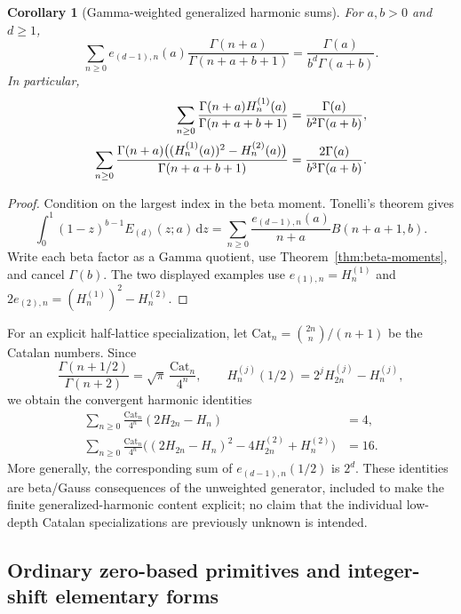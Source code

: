 \documentclass[11pt,oneside]{article}
\numberwithin{equation}{section}
\newtheorem{corollary}[theorem]{Corollary}
\theoremstyle{definition}
\theoremstyle{remark}
\newcommand{\dd}{\,\mathrm d}
\begin{document}
\begin{corollary}[Gamma-weighted generalized harmonic sums]
\label{cor:gamma-harmonic}
For $a,b>0$ and $d\ge1$,
\begin{equation}\label{eq:gamma-harmonic}
\sum_{n\ge0}e_{(d-1),n}(a)
          \frac{\Gamma(n+a)}{\Gamma(n+a+b+1)}
=\frac{\Gamma(a)}{b^d\Gamma(a+b)}.
\end{equation}
In particular,
\begin{align}
\sum_{n\ge0}\frac{\Gamma(n+a)H_n^{(1)}(a)}{\Gamma(n+a+b+1)}
 &=\frac{\Gamma(a)}{b^2\Gamma(a+b)},\notag\\
\sum_{n\ge0}\frac{\Gamma(n+a)
      \bigl((H_n^{(1)}(a))^2-H_n^{(2)}(a)\bigr)}{\Gamma(n+a+b+1)}
 &=\frac{2\Gamma(a)}{b^3\Gamma(a+b)}.
\label{eq:gamma-harmonic-examples}
\end{align}
\end{corollary}
\begin{proof}
Condition on the largest index in the beta moment. Tonelli's theorem gives
\[
\int_0^1(1-z)^{b-1}E_{(d)}(z;a)\dd z
=\sum_{n\ge0}\frac{e_{(d-1),n}(a)}{n+a}B(n+a+1,b).
\]
Write each beta factor as a Gamma quotient, use
Theorem~\ref{thm:beta-moments}, and cancel $\Gamma(b)$. The two displayed
examples use $e_{(1),n}=H_n^{(1)}$ and
$2e_{(2),n}=(H_n^{(1)})^2-H_n^{(2)}$.
\end{proof}

For an explicit half-lattice specialization, let
$\mathrm{Cat}_n=\binom{2n}{n}/(n+1)$ be the Catalan numbers. Since
\[
\frac{\Gamma(n+1/2)}{\Gamma(n+2)}
=\sqrt\pi\,\frac{\mathrm{Cat}_n}{4^n},\qquad
H_n^{(j)}(1/2)=2^jH_{2n}^{(j)}-H_n^{(j)},
\]
we obtain the convergent harmonic identities
\begin{align}
\sum_{n\ge0}\frac{\mathrm{Cat}_n}{4^n}(2H_{2n}-H_n)&=4,\label{eq:catalan1}\\
\sum_{n\ge0}\frac{\mathrm{Cat}_n}{4^n}
 \bigl((2H_{2n}-H_n)^2-4H_{2n}^{(2)}+H_n^{(2)}\bigr)&=16.
\label{eq:catalan2}
\end{align}
More generally, the corresponding sum of $e_{(d-1),n}(1/2)$ is $2^d$.
These identities are beta/Gauss consequences of the unweighted generator,
included to make the finite generalized-harmonic content explicit; no claim
that the individual low-depth Catalan specializations are previously unknown
is intended.

\subsection{Ordinary zero-based primitives and integer-shift elementary forms}
\end{document}
